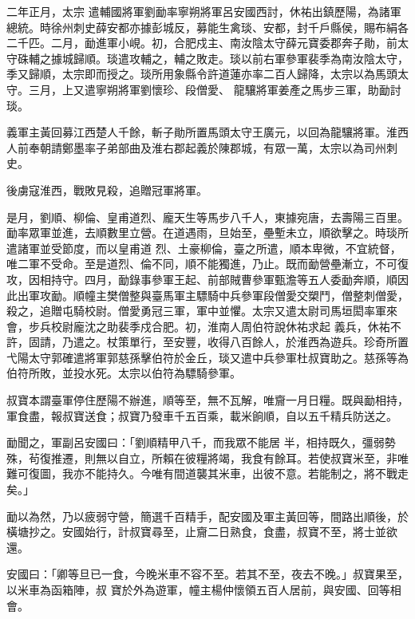 \begin{pinyinscope}
 二年正月，太宗
 遣輔國將軍劉勔率寧朔將軍呂安國西討，休祐出鎮歷陽，為諸軍總統。時徐州刺史薛安都亦據彭城反，募能生禽琰、安都，封千戶縣侯，賜布絹各二千匹。二月，勔進軍小峴。初，合肥戍主、南汝陰太守薛元寶委郡奔子勛，前太守硃輔之據城歸順。琰遣攻輔之，輔之敗走。琰以前右軍參軍裴季為南汝陰太守，季又歸順，太宗即而授之。琰所用象縣令許道蓮亦率二百人歸降，太宗以為馬頭太守。三月，上又遣寧朔將軍劉懷珍、段僧愛、
 龍驤將軍姜產之馬步三軍，助勔討琰。



 義軍主黃回募江西楚人千餘，斬子勛所置馬頭太守王廣元，以回為龍驤將軍。淮西人前奉朝請鄭墨率子弟部曲及淮右郡起義於陳郡城，有眾一萬，太宗以為司州刺史。



 後虜寇淮西，戰敗見殺，追贈冠軍將軍。



 是月，劉順、柳倫、皇甫道烈、龐天生等馬步八千人，東據宛唐，去壽陽三百里。勔率眾軍並進，去順數里立營。在道遇雨，旦始至，壘塹未立，順欲擊之。時琰所遣諸軍並受節度，而以皇甫道
 烈、土豪柳倫，臺之所遣，順本卑微，不宜統督，唯二軍不受命。至是道烈、倫不同，順不能獨進，乃止。既而勔營壘漸立，不可復攻，因相持守。四月，勔錄事參軍王起、前部賊曹參軍甄澹等五人委勔奔順，順因此出軍攻勔。順幢主樊僧整與臺馬軍主驃騎中兵參軍段僧愛交槊鬥，僧整刺僧愛，殺之，追贈屯騎校尉。僧愛勇冠三軍，軍中並懼。太宗又遣太尉司馬垣閎率軍來會，步兵校尉龐沈之助裴季戍合肥。初，淮南人周伯符說休祐求起
 義兵，休祐不許，固請，乃遣之。杖策單行，至安豐，收得八百餘人，於淮西為遊兵。珍奇所置弋陽太守郭確遣將軍郭慈孫擊伯符於金丘，琰又遣中兵參軍杜叔寶助之。慈孫等為伯符所敗，並投水死。太宗以伯符為驃騎參軍。



 叔寶本謂臺軍停住歷陽不辦進，順等至，無不瓦解，唯齎一月日糧。既與勔相持，軍食盡，報叔寶送食；叔寶乃發車千五百乘，載米餉順，自以五千精兵防送之。



 勔聞之，軍副呂安國曰：「劉順精甲八千，而我眾不能居
 半，相持既久，彊弱勢殊，茍復推遷，則無以自立，所賴在彼糧將竭，我食有餘耳。若使叔寶米至，非唯難可復圖，我亦不能持久。今唯有間道襲其米車，出彼不意。若能制之，將不戰走矣。」



 勔以為然，乃以疲弱守營，簡選千百精手，配安國及軍主黃回等，間路出順後，於橫塘抄之。安國始行，計叔寶尋至，止齎二日熟食，食盡，叔寶不至，將士並欲還。



 安國曰：「卿等旦已一食，今晚米車不容不至。若其不至，夜去不晚。」叔寶果至，以米車為函箱陣，叔
 寶於外為遊軍，幢主楊仲懷領五百人居前，與安國、回等相會。




\end{pinyinscope}
